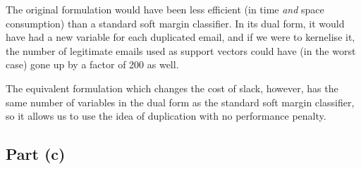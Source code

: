 The original formulation would have been less efficient (in time \textit{and} space consumption) than a standard soft margin classifier. In its dual form, it would have had a new variable for each duplicated email, and if we were to kernelise it, the number of legitimate emails used as support vectors could have (in the worst case) gone up by a factor of 200 as well.

The equivalent formulation which changes the cost of slack, however, has the same number of variables in the dual form as the standard soft margin classifier, so it allows us to use the idea of duplication with no performance penalty.

\subsection{Part (c)}
